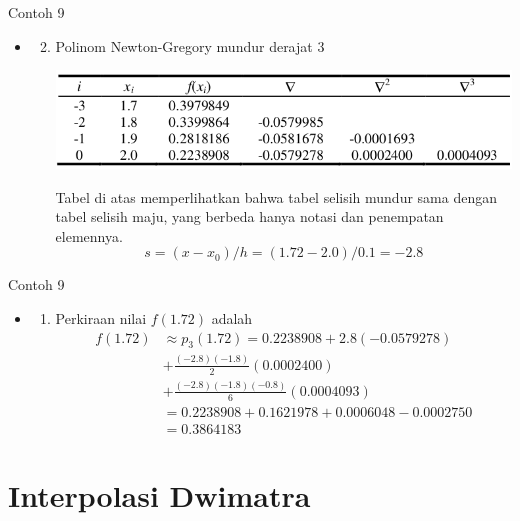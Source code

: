 \documentclass[pdflatex,compress,mathserif]{beamer}
\begin{document}
\begin{frame}{Contoh 9}
	\begin{itemize}
		\item[]
		\begin{enumerate}
			\setcounter{enumi}{1}
			\item Polinom Newton-Gregory mundur derajat 3
			\begin{center}
				\includegraphics[width=\linewidth]{img/img28}
			\end{center}
			Tabel di atas memperlihatkan bahwa tabel selisih mundur sama dengan tabel selisih maju, yang berbeda hanya notasi dan penempatan elemennya.
			\[ s = (x - x_0)/h = (1.72 - 2.0)/0.1 = -2.8 \]
		\end{enumerate}
	\end{itemize}
\end{frame}

\begin{frame}{Contoh 9}
	\begin{itemize}
		\item[]
		\begin{enumerate}
			\item[] Perkiraan nilai $ f(1.72) $ adalah
			\begin{align*}
			f(1.72) &\approx p_3(1.72) = 0.2238908 + 2.8(-0.0579278) \\
			&+ \frac{(-2.8)(-1.8)}{2}(0.0002400) \\
			&+ \frac{(-2.8)(-1.8)(-0.8)}{6}(0.0004093) \\
			&= 0.2238908 + 0.1621978 + 0.0006048 - 0.0002750 \\
			&= 0.3864183
			\end{align*}
		\end{enumerate}
	\end{itemize}
\end{frame}

\section{Interpolasi Dwimatra}
\end{document}
